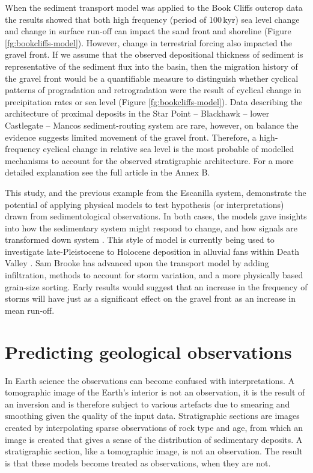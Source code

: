 When the sediment transport model was applied to the Book Cliffs outcrop data the results showed that both high frequency (period of 100\,kyr) sea level change and change in surface run-off can impact the sand front and shoreline (Figure \ref{fg:bookcliffs-model}). However, change in terrestrial forcing also impacted the gravel front. If we assume that the observed depositional thickness of sediment is representative of the sediment flux into the basin, then the migration history of the gravel front would be a quantifiable measure to distinguish whether cyclical patterns of progradation and retrogradation were the result of cyclical change in precipitation rates or sea level (Figure \ref{fg:bookcliffs-model}). Data describing the architecture of proximal deposits in the Star Point -- Blackhawk -- lower Castlegate -- Mancos sediment-routing system are rare, however, on balance the evidence suggests limited movement of the gravel front. Therefore, a high-frequency cyclical change in relative sea level is the most probable of modelled mechanisms to account for the observed stratigraphic architecture. For a more detailed explanation see the full article in the Annex B.

This study, and the previous example from the Escanilla system, demonstrate the potential of applying physical models to test hypothesis (or interpretations) drawn from sedimentological observations. In both cases, the models gave insights into how the sedimentary system might respond to change, and how signals are transformed down system \citep{armitage-etal-ngeo-2011}. This style of model is currently being used to investigate late-Pleistocene to Holocene deposition in alluvial fans within Death Valley \citep[see][]{brooke-etal-2018}. Sam Brooke has advanced upon the transport model by adding infiltration, methods to account for storm variation, and a more physically based grain-size sorting. Early results would suggest that an increase in the frequency of storms will have just as a significant effect on the gravel front as an increase in mean run-off. 

\section{Predicting geological observations}

In Earth science the observations can become confused with interpretations. A tomographic image of the Earth's interior is not an observation, it is the result of an inversion and is therefore subject to various artefacts due to smearing and smoothing given the quality of the input data. Stratigraphic sections are images created by interpolating sparse observations of rock type and age, from which an image is created that gives a sense of the distribution of sedimentary deposits. A stratigraphic section, like a tomographic image, is not an observation. The result is that these models become treated as observations, when they are not.

